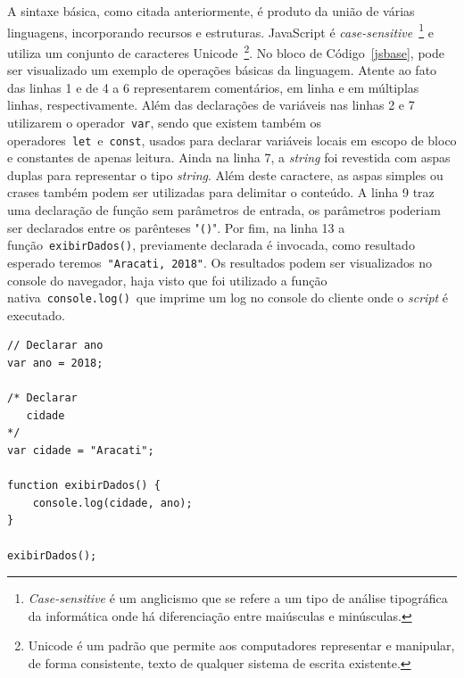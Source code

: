 A sintaxe básica, como citada anteriormente, é produto da união de várias linguagens, incorporando recursos e estruturas. JavaScript é \textit{case-sensitive}~\footnote{\textit{Case-sensitive} é um anglicismo que se refere a um tipo de análise tipográfica da informática onde há diferenciação entre maiúsculas e minúsculas.} e utiliza um conjunto de caracteres Unicode~\footnote{Unicode é um padrão que permite aos computadores representar e manipular, de forma consistente, texto de qualquer sistema de escrita existente.}. No bloco de Código~\ref{jsbase}, pode ser visualizado um exemplo de operações básicas da linguagem. Atente ao fato das linhas 1 e de 4 a 6 representarem comentários, em linha e em múltiplas linhas, respectivamente. Além das declarações de variáveis nas linhas 2 e 7 utilizarem o operador~\texttt{var}, sendo que existem também os operadores~\texttt{let}~e~\texttt{const}, usados para declarar variáveis locais em escopo de bloco e constantes de apenas leitura. Ainda na linha 7, a \textit{string} foi revestida com aspas duplas para representar o tipo \textit{string}. Além deste caractere, as aspas simples ou crases também podem ser utilizadas para delimitar o conteúdo. A linha 9 traz uma declaração de função sem parâmetros de entrada, os parâmetros poderiam ser declarados entre os parênteses "\texttt{()}". Por fim, na linha 13 a função~\texttt{exibirDados()}, previamente declarada é invocada, como resultado esperado teremos~\texttt{"Aracati, 2018"}. Os resultados podem ser visualizados no console do navegador, haja visto que foi utilizado a função nativa~\texttt{console.log()}~que imprime um log no console do cliente onde o \textit{script} é executado.

\begin{lstlisting}[label=jsbase,caption=Exemplo de um código JS.]
// Declarar ano
var ano = 2018;

/* Declarar
   cidade
*/
var cidade = "Aracati";

function exibirDados() {
    console.log(cidade, ano);
}

exibirDados();
\end{lstlisting}


